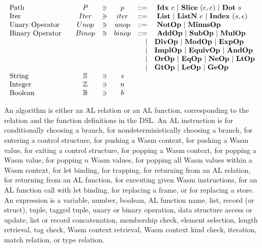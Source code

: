 \newpage
\begin{align*}
\begin{array}{lcccrlr}
%
  \text{Path}\quad& P &\ni& p &::=& ~ \idxp ~ e ~ | ~ \slicep ~ (e, e) ~ | ~ \dotp ~ s \\
%
  \text{Iter}\quad& Iter &\ni& iter &::=& ~ \listiter ~ | ~ \listniter ~ e ~|~ \listidxiter ~ (s, e) \\
%
  \text{Unary Operator}\quad& Unop &\ni& unop &::=& ~ \notop ~ | ~ \minusop \\
  \text{Binary Operator}\quad& Binop &\ni& binop &::=& ~ \addop ~ | ~ \subop ~ | ~ \mulop \\
    &&&& | & \divop ~ | ~ \modop ~ | ~ \expop \\
    &&&& | & \implop ~ | ~ \equivop ~ | ~ \andop \\
    &&&& | & \orop ~ | ~ \eqop ~ | ~ \neop ~ | ~ \ltop \\
    &&&& | & \gtop ~ | ~ \leop ~ | ~ \geop \\
  \text{String}\quad& \mathbb S &\ni& s \\
  \text{Integer}\quad& \mathbb Z &\ni& n \\
  \text{Boolean}\quad& \mathbb B &\ni& b \\
\end{array}
\end{align*}

An algorithm is either an AL relation or an AL function, corresponding to the
relation and the function definitions in the DSL.
An AL instruction is \ifi{} for conditionally choosing a branch, \eitheri{} for
nondeterministically choosing a branch, \enteri{} for entering a control
structure, \pushctxi{} for pushing a Wasm context, \pushi{} for pushing a Wasm
value, \exiti{} for exiting a control structure, \popctxi{} for popping a Wasm
context, \popi{} for popping a Wasm value, \popni{} for popping $n$ Wasm
values, \popalli{} for popping all Wasm values within a Wasm context, 
for let binding, \trapi{} for trapping, \returnreli{} for returning from an AL
relation, \returnfuni{} for returning from an AL function, \executei{} for
executing given Wasm instructions, \calli{} for an AL function call with let
binding, \replaceframei{} for replacing a frame, or \replacestorei{} for
replacing a store.
An expression is a variable, number, boolean, AL function name, list, record
(or struct), tuple, tagged tuple, unary or binary operation, data structure
access or update, list or record concatenation, membership check, element
selection, length retrieval, tag check, Wasm context retrieval, Wasm context
kind check, iteration, match relation, or type relation.


